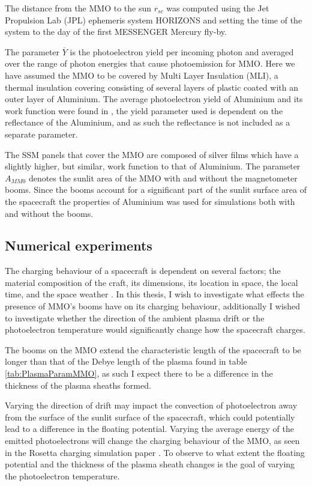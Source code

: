 The distance from the MMO to the sun $r_{sc}$ was computed using the Jet Propulsion Lab (JPL) ephemeris system HORIZONS and setting the time of the system to the day of the first MESSENGER Mercury fly-by.

The parameter $\overline{Y}$ is the photoelectron yield per incoming photon and averaged over the range of photon energies that cause photoemission for MMO. Here we have assumed the MMO to be covered by Multi Layer Insulation (MLI), a thermal insulation covering consisting of several layers of plastic coated with an outer layer of Aluminium. The average photoelectron yield of Aluminium and its work function were found in \parencite{Feuerbacher1972}, the yield parameter used is dependent on the reflectance of the Aluminium, and as such the reflectance is not included as a separate parameter. 

The SSM panels that cover the MMO are composed of silver films which have a slightly higher, but similar, work function to that of Aluminium. The parameter $A_{MM0}$ denotes the sunlit area of the MMO with and without the magnetometer booms. Since the booms account for a significant part of the sunlit surface area of the spacecraft the properties of Aluminium was used for simulations both with and without the booms.



\subsection{Numerical experiments}

The charging behaviour of a spacecraft is dependent on several factors; the material composition of the craft, its dimensions, its location in space, the local time, and the space weather \parencite{LAI2019} . In this thesis, I wish to investigate what effects the presence of MMO's booms have on its charging behaviour, additionally I wished to investigate whether the direction of the ambient plasma drift or the photoelectron temperature would significantly change how the spacecraft charges.

The booms on the MMO extend the characteristic length of the spacecraft to be longer than that of the Debye length of the plasma found in table \ref{tab:PlasmaParamMMO}, as such I expect there to be a difference in the thickness of the plasma sheaths formed. 

Varying the direction of drift may impact the convection of photoelectron away from the surface of the sunlit surface of the spacecraft, which could potentially lead to a difference in the floating potential. Varying the average energy of the emitted photoelectrons will change the charging behaviour of the MMO, as seen in the Rosetta charging simulation paper \parencite{Sjogren2012}. To observe to what extent the floating potential and the thickness of the plasma sheath changes is the goal of varying the photoelectron temperature. 


